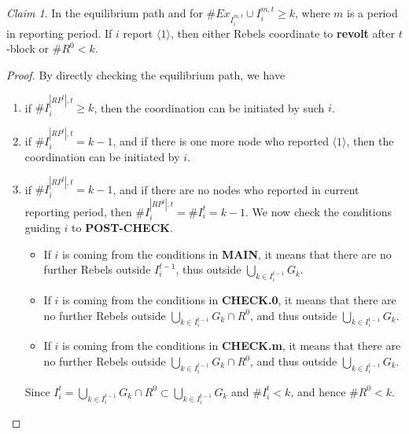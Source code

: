 \documentclass[12pt,letter]{article}
\theoremstyle{definition}
\theoremstyle{remark}
\theoremstyle{claim}
\newtheorem{claim}{Claim}
\begin{document}
\begin{claim}
\label{claim_either_success_or_fail}
In the equilibrium path and for $\#Ex_{I^{m,t}_i}\cup I^{m,t}_i\geq k$, where $m$ is a period in reporting period. If $i$ report $\langle 1 \rangle$, then either Rebels coordinate to \textbf{revolt} after $t$-block or $\# R^0<k$.
\end{claim}
\begin{proof}
By directly checking the equilibrium path, we have
\begin{enumerate}
\item if $\# I^{|RP^t|,t}_i\geq k$, then the coordination can be initiated by such $i$.
\item if $\# I^{|RP^t|,t}_i= k-1$, and if there is one more node who reported $\langle 1 \rangle$, then the coordination can be initiated by $i$.
\item if $\# I^{|RP^t|,t}_i= k-1$, and if there are no nodes who reported in current reporting period, then $\# I^{|RP^t|,t}_i=\# I^{t}_i= k-1$. We now check the conditions guiding $i$ to \textbf{POST-CHECK}.
\begin{itemize}
\item If $i$ is coming from the conditions in \textbf{MAIN}, it means that there are no further Rebels outside $I^{t-1}_i$, thus outside $\bigcup_{k\in I^{t-1}_i}G_k$.
\item If $i$ is coming from the conditions in \textbf{CHECK.0}, it means that there are no further Rebels outside $\bigcup_{k\in I^{t-1}_i}G_k\cap R^0$, and thus outside $\bigcup_{k\in I^{t-1}_i}G_k$. 
\item If $i$ is coming from the conditions in \textbf{CHECK.m}, it means that there are no further Rebels outside $\bigcup_{k\in I^{t-1}_i}G_k\cap R^0$, and thus outside $\bigcup_{k\in I^{t-1}_i}G_k$. 
\end{itemize}
Since $I^t_i=\bigcup_{k\in I^{t-1}_i}G_k\cap R^0 \subset \bigcup_{k\in I^{t-1}_i}G_k$ and $\#I^t_i<k$, and hence $\# R^0<k$.

\end{enumerate}


\end{proof}
\end{document}

